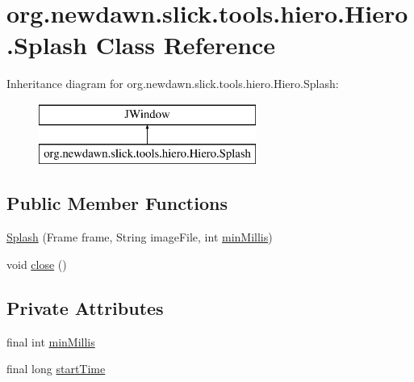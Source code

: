 \hypertarget{classorg_1_1newdawn_1_1slick_1_1tools_1_1hiero_1_1_hiero_1_1_splash}{}\section{org.\+newdawn.\+slick.\+tools.\+hiero.\+Hiero.\+Splash Class Reference}
\label{classorg_1_1newdawn_1_1slick_1_1tools_1_1hiero_1_1_hiero_1_1_splash}
Inheritance diagram for org.\+newdawn.\+slick.\+tools.\+hiero.\+Hiero.\+Splash\+:\begin{figure}[H]
\begin{center}
\leavevmode
\includegraphics[height=2.000000cm]{classorg_1_1newdawn_1_1slick_1_1tools_1_1hiero_1_1_hiero_1_1_splash}
\end{center}
\end{figure}
\subsection*{Public Member Functions}
\begin{DoxyCompactItemize}
\item 
\mbox{\hyperlink{classorg_1_1newdawn_1_1slick_1_1tools_1_1hiero_1_1_hiero_1_1_splash_a99f1c81dda31cc8343280493b4d90c7f}{Splash}} (Frame frame, String image\+File, int \mbox{\hyperlink{classorg_1_1newdawn_1_1slick_1_1tools_1_1hiero_1_1_hiero_1_1_splash_a4a6f03856af4186e89f91fc54d722ca7}{min\+Millis}})
\item 
void \mbox{\hyperlink{classorg_1_1newdawn_1_1slick_1_1tools_1_1hiero_1_1_hiero_1_1_splash_a269c0f1d57d4eea0d5f4d11c1d5c34b7}{close}} ()
\end{DoxyCompactItemize}
\subsection*{Private Attributes}
\begin{DoxyCompactItemize}
\item 
final int \mbox{\hyperlink{classorg_1_1newdawn_1_1slick_1_1tools_1_1hiero_1_1_hiero_1_1_splash_a4a6f03856af4186e89f91fc54d722ca7}{min\+Millis}}
\item 
final long \mbox{\hyperlink{classorg_1_1newdawn_1_1slick_1_1tools_1_1hiero_1_1_hiero_1_1_splash_a455ff850b006e49cfa0cfeb29cdcd022}{start\+Time}}
\end{DoxyCompactItemize}



